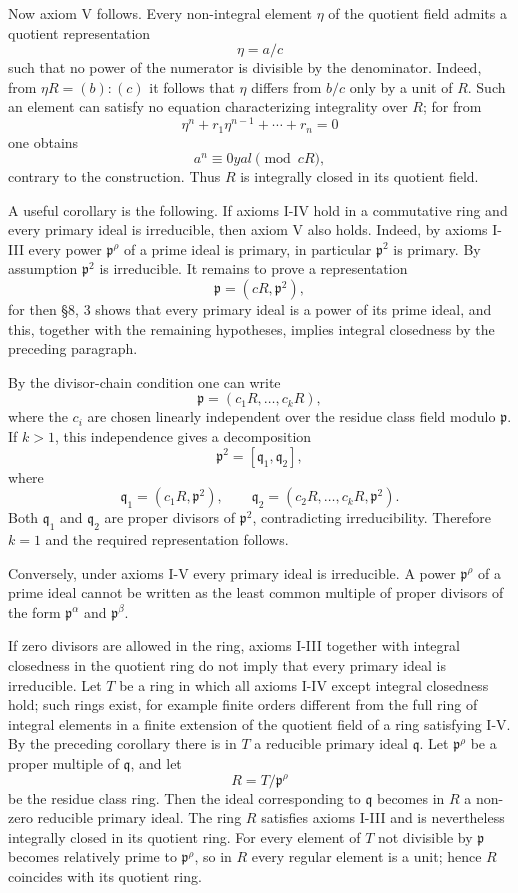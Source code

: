 \documentclass[
  12pt,
]{article}
\begin{document}
Now axiom V follows. Every non-integral element \(\eta\) of the quotient
field admits a quotient representation \[
  \eta=a/c
\] such that no power of the numerator is divisible by the denominator.
Indeed, from \(\eta R=(b):(c)\) it follows that \(\eta\) differs from
\(b/c\) only by a unit of \(R\). Such an element can satisfy no equation
characterizing integrality over \(R\); for from \[
  \eta^n+r_1\eta^{n-1}+\cdots+r_n=0
\] one obtains \[
  a^n\equiv0
yal\pmod{cR},
\] contrary to the construction. Thus \(R\) is integrally closed in its
quotient field.

A useful corollary is the following. If axioms I-IV hold in a
commutative ring and every primary ideal is irreducible, then axiom V
also holds. Indeed, by axioms I-III every power \(\mathfrak p^{\rho}\)
of a prime ideal is primary, in particular \(\mathfrak p^2\) is primary.
By assumption \(\mathfrak p^2\) is irreducible. It remains to prove a
representation \[
  \mathfrak p=(cR,\mathfrak p^2),
\] for then §8, 3 shows that every primary ideal is a power of its prime
ideal, and this, together with the remaining hypotheses, implies
integral closedness by the preceding paragraph.

By the divisor-chain condition one can write \[
  \mathfrak p=(c_1R,\ldots,c_kR),
\] where the \(c_i\) are chosen linearly independent over the residue
class field modulo \(\mathfrak p\). If \(k>1\), this independence gives
a decomposition \[
  \mathfrak p^2=[\mathfrak q_1,
\mathfrak q_2],
\] where \[
  \mathfrak q_1=(c_1R,\mathfrak p^2),
  \qquad
  \mathfrak q_2=(c_2R,
\ldots,c_kR,\mathfrak p^2).
\] Both \(\mathfrak q_1\) and \(\mathfrak q_2\) are proper divisors of
\(\mathfrak p^2\), contradicting irreducibility. Therefore \(k=1\) and
the required representation follows.

Conversely, under axioms I-V every primary ideal is irreducible. A power
\(\mathfrak p^{\rho}\) of a prime ideal cannot be written as the least
common multiple of proper divisors of the form \(\mathfrak p^{\alpha}\)
and \(\mathfrak p^{\beta}\).

If zero divisors are allowed in the ring, axioms I-III together with
integral closedness in the quotient ring do not imply that every primary
ideal is irreducible. Let \(T\) be a ring in which all axioms I-IV
except integral closedness hold; such rings exist, for example finite
orders different from the full ring of integral elements in a finite
extension of the quotient field of a ring satisfying I-V. By the
preceding corollary there is in \(T\) a reducible primary ideal
\(\mathfrak q\). Let \(\mathfrak p^{\rho}\) be a proper multiple of
\(\mathfrak q\), and let \[
  R=T/\mathfrak p^{\rho}
\] be the residue class ring. Then the ideal corresponding to
\(\mathfrak q\) becomes in \(R\) a non-zero reducible primary ideal. The
ring \(R\) satisfies axioms I-III and is nevertheless integrally closed
in its quotient ring. For every element of \(T\) not divisible by
\(\mathfrak p\) becomes relatively prime to \(\mathfrak p^{\rho}\), so
in \(R\) every regular element is a unit; hence \(R\) coincides with its
quotient ring.
\end{document}
